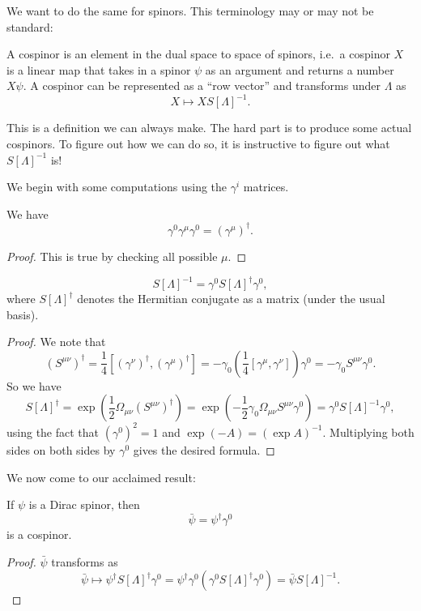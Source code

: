 \documentclass[a4paper]{article}
\begin{document}
We want to do the same for spinors. This terminology may or may not be standard:
\begin{defi}[Cospinor]
  A cospinor is an element in the dual space to space of spinors, i.e.\ a cospinor $X$ is a linear map that takes in a spinor $\psi$ as an argument and returns a number $X\psi$. A cospinor can be represented as a ``row vector'' and transforms under $\Lambda$ as
  \[
    X \mapsto X S[\Lambda]^{-1}.
  \]
\end{defi}
This is a definition we can always make. The hard part is to produce some actual cospinors. To figure out how we can do so, it is instructive to figure out what $S[\Lambda]^{-1}$ is!

We begin with some computations using the $\gamma^i$ matrices.
\begin{prop}
  We have
  \[
    \gamma^0 \gamma^\mu \gamma^0 = (\gamma^\mu)^\dagger.
  \]
\end{prop}

\begin{proof}
  This is true by checking all possible $\mu$.
\end{proof}

\begin{prop}
  \[
    S[\Lambda]^{-1} = \gamma^0 S[\Lambda]^\dagger \gamma^0,
  \]
  where $S[\Lambda]^\dagger$ denotes the Hermitian conjugate as a matrix (under the usual basis).
\end{prop}

\begin{proof}
  We note that
  \[
    (S^{\mu\nu})^\dagger = \frac{1}{4}[(\gamma^\nu)^\dagger, (\gamma^\mu)^\dagger] = -\gamma_0 \left(\frac{1}{4}[\gamma^\mu, \gamma^\nu]\right) \gamma^0 = - \gamma_0 S^{\mu\nu} \gamma^0.
  \]
  So we have
  \[
    S[\Lambda]^\dagger = \exp\left(\frac{1}{2} \Omega_{\mu\nu}(S^{\mu\nu})^\dagger\right) = \exp\left(-\frac{1}{2} \gamma_0 \Omega_{\mu\nu}S^{\mu\nu}\gamma^0\right) = \gamma^0 S[\Lambda]^{-1} \gamma^0,
  \]
  using the fact that $(\gamma^0)^2 = 1$ and $\exp(-A) = (\exp A)^{-1}$. Multiplying both sides on both sides by $\gamma^0$ gives the desired formula.
\end{proof}

We now come to our acclaimed result:
\begin{prop}
  If $\psi$ is a Dirac spinor, then
  \[
    \bar\psi = \psi^\dagger \gamma^0
  \]
  is a cospinor.
\end{prop}

\begin{proof}
  $\bar \psi$ transforms as
  \[
    \bar \psi \mapsto \psi^\dagger S[\Lambda]^\dagger \gamma^0 = \psi^\dagger \gamma^0 (\gamma^0 S[\Lambda]^\dagger \gamma^0) = \bar\psi S[\Lambda]^{-1}.
  \]
\end{proof}
\end{document}
